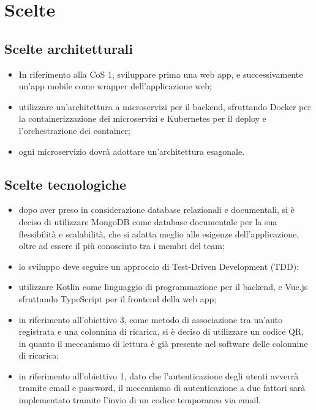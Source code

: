 \documentclass[a4paper,12pt]{article}
\begin{document}
\section{Scelte}

\subsection{Scelte architetturali}
\begin{itemize}
    \item In riferimento alla CoS 1, sviluppare prima una web app, e successivamente un'app mobile come wrapper
    dell'applicazione web;
    \item utilizzare un'architettura a microservizi per il backend, sfruttando Docker per la containerizzazione
    dei microservizi e Kubernetes per il deploy e l'orchestrazione dei container;
    \item ogni microservizio dovrà adottare un'architettura esagonale.
\end{itemize}

\subsection{Scelte tecnologiche}
\begin{itemize}
    \item dopo aver preso in considerazione database relazionali e documentali, si è deciso di utilizzare MongoDB come
    database documentale per la sua flessibilità e scalabilità, che si adatta meglio alle esigenze dell'applicazione,
    oltre ad essere il più conosciuto tra i membri del team;
    \item lo sviluppo deve seguire un approccio di Test-Driven Development (TDD);
    \item utilizzare Kotlin come linguaggio di programmazione per il backend, e Vue.js sfruttando TypeScript per il
    frontend della web app;
    \item in riferimento all'obiettivo 3, come metodo di associazione tra un'auto registrata e una colonnina di
    ricarica, si è deciso di utilizzare un codice QR, in quanto il meccanismo di lettura è già presente nel software
    delle colonnine di ricarica;
    \item in riferimento all'obiettivo 1, dato che l'autenticazione degli utenti avverrà tramite email e password,
    il meccanismo di autenticazione a due fattori sarà implementato tramite l'invio di un codice temporaneo via email.
\end{itemize}
\end{document}
